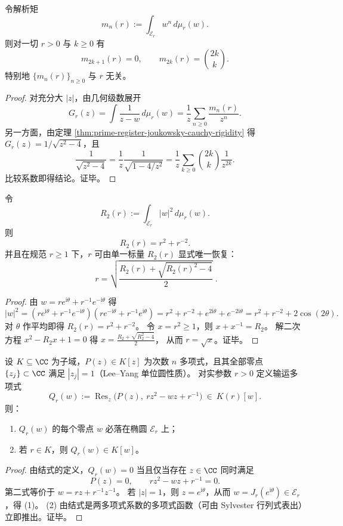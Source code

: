 \begin{corollary}\label{cor:prime-register-joukowsky-analytic-moments}
令解析矩
\[
m_n(r):=\int_{\mathcal E_r} w^n\,d\mu_r(w).
\]
则对一切 \(r>0\) 与 \(k\ge 0\) 有
\[
m_{2k+1}(r)=0,
\qquad
m_{2k}(r)=\binom{2k}{k}.
\]
特别地 \(\{m_n(r)\}_{n\ge 0}\) 与 \(r\) 无关。
\end{corollary}
\begin{proof}
对充分大 \(|z|\)，由几何级数展开
\[
G_r(z)=\int\frac{1}{z-w}\,d\mu_r(w)
=\frac{1}{z}\sum_{n\ge 0}\frac{m_n(r)}{z^n}.
\]
另一方面，由定理 \ref{thm:prime-register-joukowsky-cauchy-rigidity} 得 \(G_r(z)=1/\sqrt{z^2-4}\)，且
\[
\frac{1}{\sqrt{z^2-4}}
=\frac{1}{z}\frac{1}{\sqrt{1-4/z^2}}
=\frac{1}{z}\sum_{k\ge 0}\binom{2k}{k}\frac{1}{z^{2k}}.
\]
比较系数即得结论。证毕。
\end{proof}

\begin{proposition}\label{prop:prime-register-joukowsky-radial-moment-invert}
令
\[
R_2(r):=\int_{\mathcal E_r}|w|^2\,d\mu_r(w).
\]
则
\[
R_2(r)=r^2+r^{-2}.
\]
并且在规范 \(r\ge 1\) 下，\(r\) 可由单一标量 \(R_2(r)\) 显式唯一恢复：
\[
\boxed{\;
r=\sqrt{\frac{R_2(r)+\sqrt{R_2(r)^2-4}}{2}}\; }.
\]
\end{proposition}
\begin{proof}
由 \(w=r e^{\mathrm{i}\theta}+r^{-1}e^{-\mathrm{i}\theta}\) 得
\[
|w|^2
=(r e^{\mathrm{i}\theta}+r^{-1}e^{-\mathrm{i}\theta})(r e^{-\mathrm{i}\theta}+r^{-1}e^{\mathrm{i}\theta})
=r^2+r^{-2}+e^{2\mathrm{i}\theta}+e^{-2\mathrm{i}\theta}
=r^2+r^{-2}+2\cos(2\theta).
\]
对 \(\theta\) 作平均即得 \(R_2(r)=r^2+r^{-2}\)。
令 \(x=r^2\ge 1\)，则 \(x+x^{-1}=R_2\)。
解二次方程 \(x^2-R_2 x+1=0\) 得
\(
x=\frac{R_2+\sqrt{R_2^2-4}}{2}
\)，
从而 \(r=\sqrt{x}\)。证毕。
\end{proof}

\begin{theorem}\label{thm:prime-register-leyang-joukowsky-transport}
设 \(K\subseteq \CC\) 为子域，\(P(z)\in K[z]\) 为次数 \(n\) 多项式，且其全部零点 \(\{z_j\}\subset \CC\) 满足 \(|z_j|=1\)（Lee--Yang 单位圆性质）。
对实参数 \(r>0\) 定义输运多项式
\[
Q_r(w):=\operatorname{Res}_{z}\!\bigl(P(z),\ r z^2-w z+r^{-1}\bigr)\ \in\ K(r)[w].
\]
则：
\begin{enumerate}
  \item \(Q_r(w)\) 的每个零点 \(w\) 必落在椭圆 \(\mathcal E_r\) 上；
  \item 若 \(r\in K\)，则 \(Q_r(w)\in K[w]\)。
\end{enumerate}
\end{theorem}
\begin{proof}
由结式的定义，\(Q_r(w)=0\) 当且仅当存在 \(z\in\CC\) 同时满足
\[
P(z)=0,\qquad r z^2-w z+r^{-1}=0.
\]
第二式等价于
\(
w=r z+r^{-1}z^{-1}
\)。
若 \(|z|=1\)，则 \(z=e^{\mathrm{i}\theta}\)，从而 \(w=J_r(e^{\mathrm{i}\theta})\in\mathcal E_r\)，得 (1)。
(2) 由结式是两多项式系数的多项式函数（可由 Sylvester 行列式表出）立即推出。证毕。
\end{proof}

